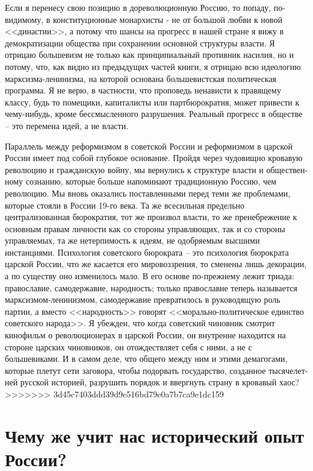 \documentclass{book}
\begin{document}
Если я перенесу свою позицию в дореволюционную Россию, то попаду, по-видимому, в конституционные монархисты - не от большой любви к новой <<династии>>, а потому что шансы на прогресс в нашей стране я вижу в демократизации общества при сохранении основной структуры власти. Я отрицаю больше­визм не только как принципиальный противник насилия, но и потому, что, как видно из предыдущих частей книги, я отрицаю всю идеологию марксизма-ленинизма, на которой основана большевистская политическая программа. Я не верю, в частно­сти, что проповедь ненависти к правящему классу, будь то поме­щики, капиталисты или партбюрократия, может привести к че­му-нибудь, кроме бессмысленного разрушения. Реальный про­гресс в обществе -- это перемена идей, а не власти.

Параллель между реформизмом в советской России и ре­формизмом в царской России имеет под собой глубокое осно­вание. Пройдя через чудовищно кровавую революцию и граж­данскую войну, мы вернулись к структуре власти и обществен­ному сознанию, которые больше напоминают традиционную Россию, чем революцию. Мы вновь оказались поставленными перед теми же проблемами, которые стояли в России 19-го ве­ка. Та же всесильная предельно централизованная бюрокра­тия, тот же произвол власти, то же пренебрежение к основным правам личности как со стороны управляющих, так и со сторо­ны управляемых, та же нетерпимость к идеям, не одобряемым высшими инстанциями. Психология советского бюрократа -- это психология бюрократа царской России, что же касается его мировоззрения, то сменены лишь декорации, а по сущест­ву оно изменилось мало. В его основе по-прежнему лежит три­ада: православие, самодержавие, народность; только правосла­вие теперь называется марксизмом-ленинизмом, самодержа­вие превратилось в руководящую роль партии, а вместо 
<<на­родность>> говорят <<морально-политическое единство совет­ского народа>>. Я убежден, что когда советский чиновник смот­рит кинофильм о революционерах в царской России, он внут­ренне находится на стороне царских чиновников, он отожде­ствляет себя с ними, а не с большевиками. И в самом деле, что общего между ним и этими демагогами, которые плетут сети заговора, чтобы подорвать государство, созданное тысячелет­ней русской историей, разрушить порядок и ввергнуть страну в кровавый хаос?
>>>>>>> 3d45c7403ddd39d9e516bd79e0a7b7ca9e1dc159


\section{Чему же учит нас исторический опыт России?}
\end{document}
